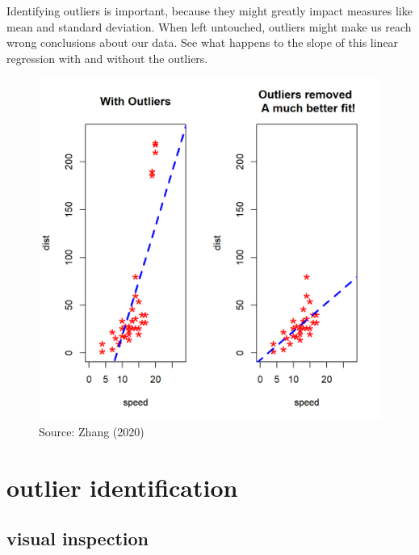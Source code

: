 \documentclass[
  letterpaper,
  DIV=11,
  numbers=noendperiod,
  oneside]{scrreprt}
\begin{document}
Identifying outliers is important, because they might greatly impact
measures like mean and standard deviation. When left untouched, outliers
might make us reach wrong conclusions about our data. See what happens
to the slope of this linear regression with and without the outliers.

\begin{figure}

{\centering \includegraphics{outliers/regression-outlier.png}

}

\caption{Source: Zhang (2020)}

\end{figure}

\hypertarget{outlier-identification}{%
\chapter{outlier identification}\label{outlier-identification}}

\hypertarget{visual-inspection}{%
\section{visual inspection}\label{visual-inspection}}
\end{document}
